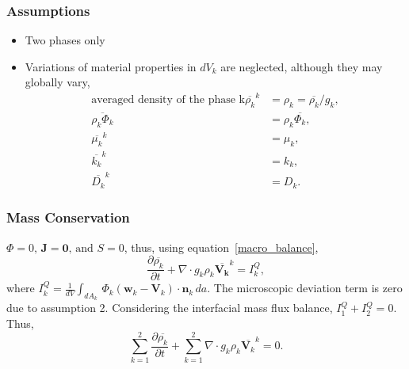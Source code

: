 \subsubsection{Assumptions}
\begin{itemize}
	\item Two phases only
	\item Variations of material properties in $dV_k$ are neglected, although they may globally vary, 
	\begin{align}
		\text{averaged density of the phase k}\overline{\rho_k}^{k} &= \rho_k = \overline{\rho_k}/g_k,\\
		\overline{\rho_k \Phi_k} &= \rho_k \overline{\Phi_k},\\
		\overline{\mu_k}^{k} &= \mu_k,\\
		\overline{k_k}^{k} &= k_k,\\
		\overline{D_k}^{k} &= D_k.
	\end{align}
\end{itemize}
\subsubsection{Mass Conservation}
$\Phi=0,\,\mathbf{J} = \mathbf{0},\, \text{and } S = 0$, thus, using equation~\ref{macro_balance},
\begin{equation}\label{macro_mass_conservation}
	\frac{\partial \overline{\rho_k}}{\partial t} + \nabla\cdot g_k \rho_k \overline{\mathbf{V_k}}^k = I_k^{Q},
\end{equation}
where $I_k^{Q} = \frac{1}{dV}\int_{dA_{k}}\, \Phi_{k}(\mathbf{w}_{k} - \mathbf{V}_{k}) \cdot \mathbf{n}_{k}\,da$.
The microscopic deviation term is zero due to assumption 2. Considering the interfacial mass flux balance, $I_1^{Q} + I_2^{Q} = 0$. Thus,\newline
\begin{equation}
	\sum_{k=1}^{2}\frac{\partial \overline{\rho_k}}{\partial t} + \sum_{k=1}^{2} \nabla\cdot g_k \rho_k \overline{\mathbf{V}_k}^k = 0.
\end{equation}

